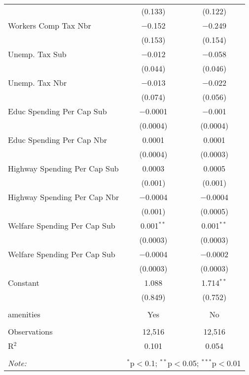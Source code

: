 \begin{table}[!htbp]
\begin{tabular}{@{\extracolsep{5pt}}lcc}
  & (0.133) & (0.122) \\ 
  Workers Comp Tax Nbr & $-$0.152 & $-$0.249 \\ 
  & (0.153) & (0.154) \\ 
  Unemp. Tax Sub & $-$0.012 & $-$0.058 \\ 
  & (0.044) & (0.046) \\ 
  Unemp. Tax Nbr & $-$0.013 & $-$0.022 \\ 
  & (0.074) & (0.056) \\ 
  Educ Spending Per Cap Sub & $-$0.0001 & $-$0.001 \\ 
  & (0.0004) & (0.0004) \\ 
  Educ Spending Per Cap Nbr & 0.0001 & 0.0001 \\ 
  & (0.0004) & (0.0003) \\ 
  Highway Spending Per Cap Sub & 0.0003 & 0.0005 \\ 
  & (0.001) & (0.001) \\ 
  Highway Spending Per Cap Nbr & $-$0.0004 & $-$0.0004 \\ 
  & (0.001) & (0.0005) \\ 
  Welfare Spending Per Cap Sub & 0.001$^{**}$ & 0.001$^{**}$ \\ 
  & (0.0003) & (0.0003) \\ 
  Welfare Spending Per Cap Sub & $-$0.0004 & $-$0.0002 \\ 
  & (0.0003) & (0.0003) \\ 
  Constant & 1.088 & 1.714$^{**}$ \\ 
  & (0.849) & (0.752) \\ 
 \hline \\[-1.8ex] 
amenities & Yes & No \\ 
\hline \\[-1.8ex] 
Observations & 12,516 & 12,516 \\ 
R$^{2}$ & 0.101 & 0.054 \\ 
\hline 
\hline \\[-1.8ex] 
\textit{Note:}  & \multicolumn{2}{r}{$^{*}$p$<$0.1; $^{**}$p$<$0.05; $^{***}$p$<$0.01} \\ 
\end{tabular} 
\end{table} 

